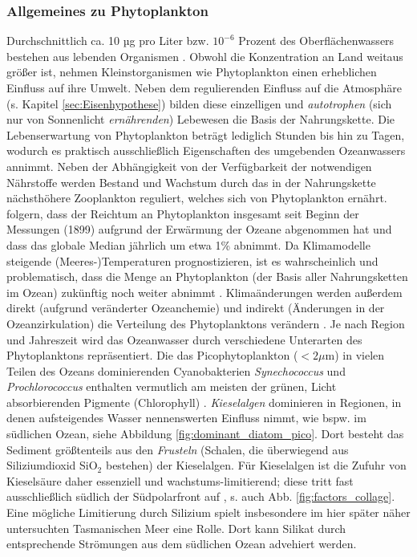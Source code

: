 \documentclass[12pt,a4paper,onecolumn]{scrartcl}
\begin{document}
\subsubsection{Allgemeines zu Phytoplankton} \label{sec:Phytobasics}
Durchschnittlich ca. 10 µg pro Liter bzw. $10^{-6}$ Prozent des Oberflächenwassers bestehen aus lebenden Organismen \citep{Emerson.2009}. Obwohl die Konzentration an Land weitaus größer ist, nehmen Kleinstorganismen wie Phytoplankton einen erheblichen Einfluss auf ihre Umwelt. Neben dem regulierenden Einfluss auf die Atmosphäre (s. Kapitel \ref{sec:Eisenhypothese}) bilden diese einzelligen und \textit{autotrophen} (sich nur von Sonnenlicht \textit{ernährenden}) Lebewesen die Basis der Nahrungskette. Die Lebenserwartung von Phytoplankton beträgt lediglich Stunden bis hin zu Tagen, wodurch es praktisch ausschließlich Eigenschaften des umgebenden Ozeanwassers annimmt. Neben der Abhängigkeit von der Verfügbarkeit der notwendigen Nährstoffe werden Bestand und Wachstum durch das in der Nahrungskette nächsthöhere Zooplankton reguliert, welches sich von Phytoplankton ernährt. \citet{Boyce.2010} folgern, dass der Reichtum an Phytoplankton insgesamt seit Beginn der Messungen (1899) aufgrund der Erwärmung der Ozeane abgenommen hat und dass das globale Median jährlich um etwa 1\% abnimmt. Da Klimamodelle steigende (Meeres-)Temperaturen prognostizieren, ist es wahrscheinlich und problematisch, dass die Menge an Phytoplankton (der Basis aller Nahrungsketten im Ozean) zukünftig noch weiter abnimmt \citep{Siegel.2010}. Klimaänderungen werden außerdem direkt (aufgrund veränderter Ozeanchemie) und indirekt (Änderungen in der Ozeanzirkulation) die Verteilung des Phytoplanktons verändern \citep{Falkowski.1998}. Je nach Region und Jahreszeit wird das Ozeanwasser durch verschiedene Unterarten des Phytoplanktons repräsentiert. Die das Picophytoplankton ($<2\mu$m) in vielen Teilen des Ozeans dominierenden Cyanobakterien \textit{Synechococcus} und \textit{Prochlorococcus} enthalten vermutlich am meisten der grünen, Licht absorbierenden Pigmente (Chlorophyll) \citep{Emerson.2009}. \textit{Kieselalgen} dominieren in Regionen, in denen aufsteigendes Wasser nennenswerten Einfluss nimmt, wie bspw. im südlichen Ozean, siehe Abbildung \ref{fig:dominant_diatom_pico}. Dort besteht das Sediment größtenteils aus den \textit{Frusteln} (Schalen, die überwiegend aus Siliziumdioxid SiO$_2$ bestehen) der Kieselalgen. Für Kieselalgen ist die Zufuhr von Kieselsäure daher essenziell und wachstums-limitierend; diese tritt fast ausschließlich südlich der Südpolarfront auf \citep{Falkowski.1998}, s. auch Abb. \ref{fig:factors_collage}. Eine mögliche Limitierung durch Silizium spielt insbesondere im  hier später näher untersuchten Tasmanischen Meer eine Rolle. Dort kann Silikat durch entsprechende Strömungen aus dem südlichen Ozean advehiert werden.
\end{document}
